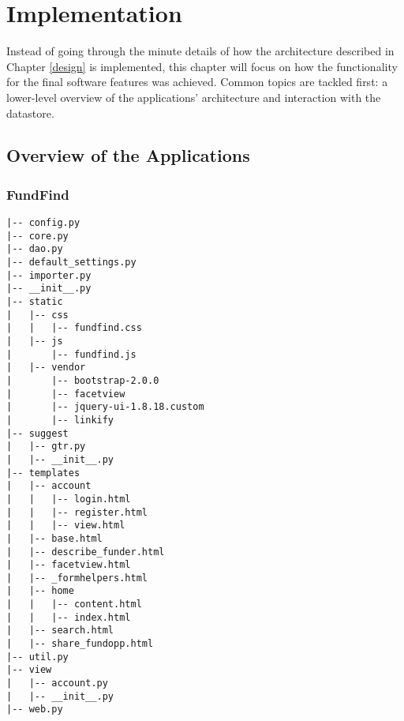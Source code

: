 \chapter{Implementation}




Instead of going through the minute details of how the architecture described in Chapter \ref{design} is implemented, this chapter will focus on how the functionality for the final software features was achieved. Common topics are tackled first: a lower-level overview of the applications' architecture and interaction with the datastore.

\section{Overview of the Applications}
\subsection{FundFind}
\begin{verbatim}
|-- config.py
|-- core.py
|-- dao.py
|-- default_settings.py
|-- importer.py
|-- __init__.py
|-- static
|   |-- css
|   |   |-- fundfind.css
|   |-- js
|       |-- fundfind.js
|   |-- vendor
|       |-- bootstrap-2.0.0
|       |-- facetview
|       |-- jquery-ui-1.8.18.custom
|       |-- linkify
|-- suggest
|   |-- gtr.py
|   |-- __init__.py
|-- templates
|   |-- account
|   |   |-- login.html
|   |   |-- register.html
|   |   |-- view.html
|   |-- base.html
|   |-- describe_funder.html
|   |-- facetview.html
|   |-- _formhelpers.html
|   |-- home
|   |   |-- content.html
|   |   |-- index.html
|   |-- search.html
|   |-- share_fundopp.html
|-- util.py
|-- view
|   |-- account.py
|   |-- __init__.py
|-- web.py
\end{verbatim}

